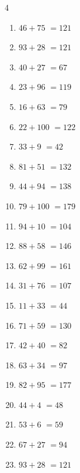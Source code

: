 \begin{multicols}{4}
\begin{enumerate}
  \item $46+75$
        $=121$

  \item $93+28$
        $=121$

  \item $40+27$
        $=67$

  \item $23+96$
        $=119$

  \item $16+63$
        $=79$

  \item $22+100$
        $=122$

  \item $33+9$
        $=42$

  \item $81+51$
        $=132$

  \item $44+94$
        $=138$

  \item $79+100$
        $=179$

  \item $94+10$
        $=104$

  \item $88+58$
        $=146$

\columnbreak %

\resetques

  \item $62+99$
        $=161$

  \item $31+76$
        $=107$

  \item $11+33$
        $=44$

  \item $71+59$
        $=130$

  \item $42+40$
        $=82$

  \item $63+34$
        $=97$

  \item $82+95$
        $=177$

  \item $44+4$
        $=48$

  \item $53+6$
        $=59$

  \item $67+27$
        $=94$

  \item $93+28$
        $=121$


\end{enumerate}
\end{multicols}
